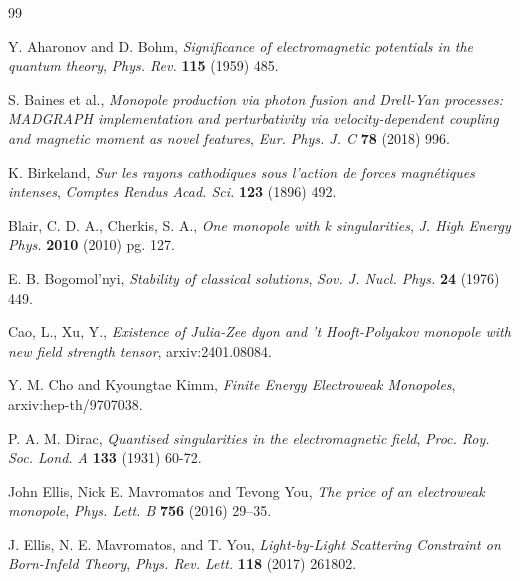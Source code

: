 \documentclass[a4paper,11pt]{article}
\begin{document}
\newpage


\begin{thebibliography}{99}

Y. Aharonov and D. Bohm, \emph{Significance of electromagnetic potentials in the quantum theory}, \emph{Phys. Rev.} {\bf 115} (1959) 485.

S. Baines et al., \emph{Monopole production via photon fusion and Drell-Yan processes: MADGRAPH implementation and perturbativity via velocity-dependent coupling and magnetic moment as novel features}, \emph{Eur. Phys. J. C} {\bf 78} (2018) 996.

K. Birkeland, \emph{Sur les rayons cathodiques sous l'action de forces magn\'etiques intenses}, \emph{Comptes Rendus Acad. Sci.} {\bf 123} (1896) 492.

Blair, C. D. A., Cherkis, S. A., \emph{One monopole with k singularities}, \emph{J. High Energy Phys.} {\bf 2010} (2010) pg. 127.

E. B. Bogomol'nyi, \emph{Stability of classical solutions}, \emph{Sov. J. Nucl. Phys.} {\bf 24} (1976) 449.

Cao, L., Xu, Y., \emph{Existence of Julia-Zee dyon and 't Hooft-Polyakov monopole with new field strength tensor}, arxiv:2401.08084.

Y. M. Cho and Kyoungtae Kimm, \emph{Finite Energy Electroweak Monopoles}, arxiv:hep-th/9707038.

P. A. M. Dirac, \emph{Quantised singularities in the electromagnetic field}, \emph{Proc. Roy. Soc. Lond. A} {\bf 133} (1931) 60-72.

John Ellis, Nick E. Mavromatos and Tevong You, \emph{The price of an electroweak monopole}, \emph{Phys. Lett. B} {\bf 756} (2016) 29–35.

J. Ellis, N. E. Mavromatos, and T. You, \emph{Light-by-Light Scattering Constraint on Born-Infeld Theory}, \emph{Phys. Rev. Lett.} {\bf 118} (2017) 261802.


\end{thebibliography}
\end{document}
